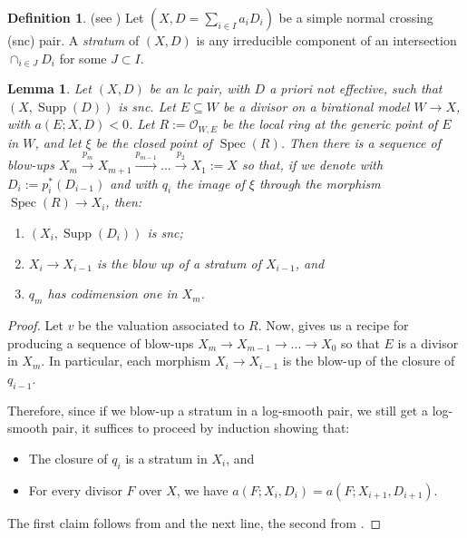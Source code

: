 \documentclass[11pt]{amsart}
\newtheorem{lemma}[theorem]{Lemma}
\theoremstyle{definition}
\newtheorem{definition}[theorem]{Definition}
\theoremstyle{remark}
\newcommand{\calO}{\mathcal O}
\newcommand{\Supp}{\operatorname{Supp}}
\newcommand{\Spec}{\operatorname{Spec}}
\begin{document}
	
	\begin{definition}\label{def:strata}(see \cite[Definition 11.10]{kollarmodulibook})
		Let $(X,D = \sum_{i \in I}a_i D_i)$ be a simple normal crossing (snc) pair. A \emph{stratum} of $(X,D)$ is any irreducible component of an intersection $\cap_{i \in J} D_i$ for some $J \subset I$. \end{definition}
	
	
	
	\begin{lemma}\label{lemma:negative:discrepancies:logsmooth:pair}
		Let $(X,D)$ be an lc pair, with $D$ a priori not effective, such that $(X,\Supp(D))$ is snc. Let $E \subseteq W$ be a divisor on a birational model $W \to X$, with $a(E;X,D)<0$. Let $R:= \calO_{W,E}$ be the local ring at the generic point of $E$ in $W$, and let $\xi$ be the closed point of $\Spec(R)$. Then there is a sequence of blow-ups $X_m \xrightarrow{p_m} X_{m+1} \xrightarrow{p_{m-1}} ... \xrightarrow{p_2} X_1:=X$ so that, if we denote with $D_i:=p_i^*(D_{i-1})$ and with $q_i$ the image of $\xi$ through the morphism $\Spec(R) \to X_i$, then:
		\begin{enumerate}
			\item $(X_i,\Supp(D_i))$ is snc;
			\item $X_{i} \to X_{i-1}$ is the blow up of a stratum of $X_{i-1}$, and
			\item $q_m$ has codimension one in $X_m$.
		\end{enumerate}
	\end{lemma}
	\begin{proof}Let $v$ be the valuation associated to $R$.
		Now, \cite[Lemma 2.45]{KM98} gives us a recipe for producing a sequence of blow-ups $X_m \to X_{m-1} \to ... \to X_0$ so that $E$ is a divisor in $X_m$. In particular, each morphism $X_i \to X_{i-1}$ is the blow-up of the closure of $q_{i-1}$.
		
		Therefore, since if we blow-up a stratum in a log-smooth pair, we still get a log-smooth pair, it suffices to proceed by induction showing that:
		\begin{itemize}
			\item The closure of $q_i$ is a stratum in $X_i$, and
			\item For every divisor $F$ over $X$, we have $a(F;X_i,D_i)=a(F;X_{i+1},D_{i+1})$.
		\end{itemize}
		The first claim follows from \cite[2.10.1]{Kollarsingmmp} and the next line, the second from \cite[Lemma 2.30]{KM98}.
	\end{proof}
	
\end{document}
